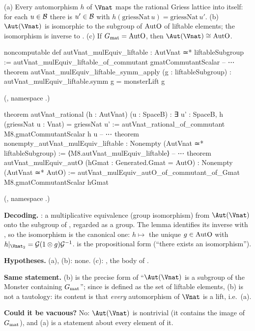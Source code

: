 \begin{theorem}\label{ch22:thm:converse}
(a) Every automorphism $h$ of $\Vnat$ maps the rational Griess lattice into itself: for each $u\in\mathcal{B}$ there is
$u'\in\mathcal{B}$ with $h(\mathrm{griessNat}\,u)=\mathrm{griessNat}\,u'$.
(b) $\Aut(\Vnat)$ is isomorphic to the subgroup of $\mathrm{AutO}$ of liftable elements; the isomorphism is inverse to
.
(c) If $G_{\mathrm{mat}}=\mathrm{AutO}$, then $\Aut(\Vnat)\cong\chtwentytwoAutO$.
\end{theorem}
\begin{leancode}
noncomputable def autVnat_mulEquiv_liftable : AutVnat ≃* liftableSubgroup :=
  autVnat_mulEquiv_liftable_of_commutant gmatCommutantScalar
-- ⋯
theorem autVnat_mulEquiv_liftable_symm_apply (g : liftableSubgroup) :
    autVnat_mulEquiv_liftable.symm g = monsterLift g
\end{leancode}
(, namespace .)
\begin{leancode}
theorem autVnat_rational (h : AutVnat) (u : SpaceB) :
    ∃ u' : SpaceB, h (griessNat u : Vnat) = griessNat u' :=
  autVnat_rational_of_commutant M8.gmatCommutantScalar h u
-- ⋯
theorem nonempty_autVnat_mulEquiv_liftable : Nonempty (AutVnat ≃* liftableSubgroup) :=
  ⟨M8.autVnat_mulEquiv_liftable⟩
-- ⋯
theorem autVnat_mulEquiv_autO (hGmat : Generated.Gmat = AutO) : Nonempty (AutVnat ≃* AutO) :=
  autVnat_mulEquiv_autO_of_commutant_of_Gmat M8.gmatCommutantScalar hGmat
\end{leancode}
(, namespace .)
\begin{dictionary}
\textbf{Decoding.}  : a multiplicative equivalence (group isomorphism) from $\Aut(\Vnat)$ onto
the subgroup  of , regarded as a group.  The  lemma identifies its inverse
with , so the isomorphism is the canonical one: $h\mapsto$ the unique $g\in\mathrm{AutO}$ with
$h|_{\Vnat_2}=\mathcal G(1\otimes g)\mathcal G^{-1}$.   is the propositional form (``there exists an isomorphism'').

\textbf{Hypotheses.}  (a), (b): none.  (c): , the body of .

\textbf{Same statement.}  (b) is the precise form of ``$\Aut(\Vnat)$ is a subgroup of the Monster containing
$G_{\mathrm{mat}}$''; since  is defined as the set of liftable elements, (b) is not a tautology: its
content is that \emph{every} automorphism of $\Vnat$ is a lift, i.e.\ (a).

\textbf{Could it be vacuous?}  No: $\Aut(\Vnat)$ is nontrivial (it contains the image of $G_{\mathrm{mat}}$), and
(a) is a statement about every element of it.
\end{dictionary}
